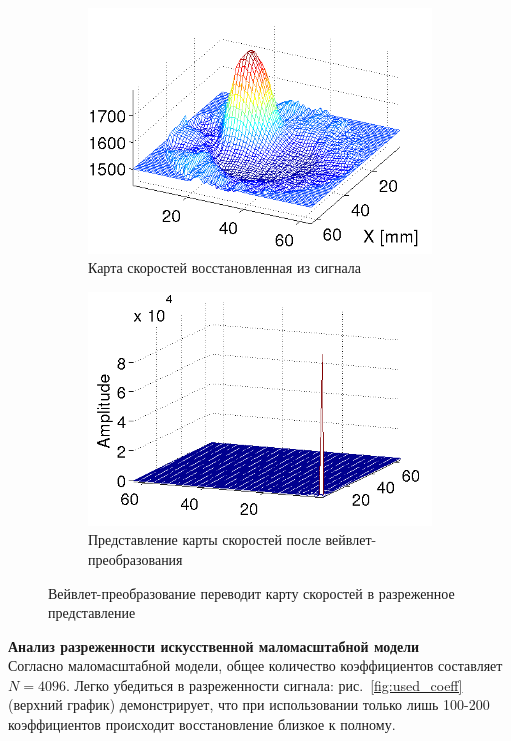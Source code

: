 \documentclass[14pt]{matmex-diploma}
\begin{document}
\begin{figure}[h]

\begin{subfigure}{.45\textwidth}
    \centering
    \includegraphics[width=0.8\linewidth]{pics/speed_map.png}
    \caption{Карта скоростей восстановленная из сигнала}
    \label{fig:speedmap}
\end{subfigure}
\begin{subfigure}{.45\textwidth}
    \centering
    \includegraphics[width=0.8\linewidth]{pics/freq_domain.png}
    \caption{Представление карты скоростей после вейвлет-преобразования}
    \label{fig:waveletted}
\end{subfigure}
    \caption{Вейвлет-преобразование переводит карту скоростей в разреженное представление}
    \label{fig:wavelet_transform}
\end{figure}

\textbf{Анализ разреженности искусственной маломасштабной модели}\\
Согласно маломасштабной модели, общее количество коэффициентов составляет $N = 4096$.  Легко убедиться в разреженности сигнала: рис.~\ref{fig:used_coeff} (верхний график) демонстрирует, что при использовании только лишь 100-200 коэффициентов происходит восстановление близкое к полному. \\
\end{document}

